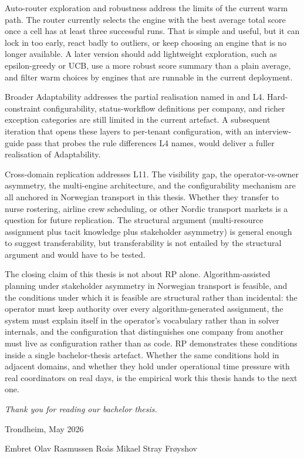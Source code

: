 Auto-router exploration and robustness address the limits of the current warm path. The router currently selects the engine with the best average total score once a cell has at least three successful runs. That is simple and useful, but it can lock in too early, react badly to outliers, or keep choosing an engine that is no longer available. A later version should add lightweight exploration, such as epsilon-greedy or UCB, use a more robust score summary than a plain average, and filter warm choices by engines that are runnable in the current deployment.

Broader Adaptability addresses the partial realisation named in  and L4. Hard-constraint configurability, status-workflow definitions per company, and richer exception categories are still limited in the current artefact. A subsequent iteration that opens these layers to per-tenant configuration, with an interview-guide pass that probes the rule differences L4 names, would deliver a fuller realisation of Adaptability.

Cross-domain replication addresses L11. The visibility gap, the operator-vs-owner asymmetry, the multi-engine architecture, and the configurability mechanism are all anchored in Norwegian transport in this thesis. Whether they transfer to nurse rostering, airline crew scheduling, or other Nordic transport markets is a question for future replication. The structural argument (multi-resource assignment plus tacit knowledge plus stakeholder asymmetry) is general enough to suggest transferability, but transferability is not entailed by the structural argument and would have to be tested.

The closing claim of this thesis is not about RP alone. Algorithm-assisted planning under stakeholder asymmetry in Norwegian transport is feasible, and the conditions under which it is feasible are structural rather than incidental: the operator must keep authority over every algorithm-generated assignment, the system must explain itself in the operator's vocabulary rather than in solver internals, and the configuration that distinguishes one company from another must live as configuration rather than as code. RP demonstrates these conditions inside a single bachelor-thesis artefact. Whether the same conditions hold in adjacent domains, and whether they hold under operational time pressure with real coordinators on real days, is the empirical work this thesis hands to the next one.


\vspace{2em}
\noindent\textit{Thank you for reading our bachelor thesis.}

\vspace{1em}
\noindent Trondheim, May 2026

\vspace{0.5em}
\noindent Embret Olav Rasmussen Roås \hspace{2em} Mikael Stray Frøyshov
